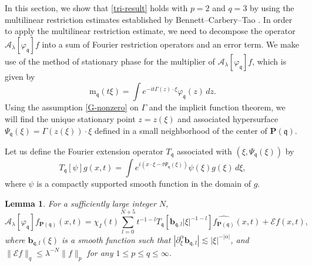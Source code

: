 \documentclass[10pt] %
{amsart}
\theoremstyle{plain}
\newtheorem{lem}[thm]{Lemma}
\numberwithin{equation}{section}
\newcommand{\fq}{\mathfrak q}
\begin{document}
In this section, we show that \eqref{tri-result} holds with $p=2$ and $q=3$ by using the multilinear restriction estimates established by Bennett--Carbery--Tao \cite{BCT}.
In order to apply the multilinear restriction estimate, we need to decompose the operator $\mathcal A_\lambda  [\varphi_{\mathfrak q}]f$ into a sum of Fourier restriction operators and an error term. 
We make use of the method of stationary phase for the multiplier of $\mathcal A_\lambda  [\varphi_{\mathfrak q }]f $, which is given by 
\[
\mathrm m_\fq (t\xi) =  \int e^{-it  \Gamma(z)\cdot \xi} \varphi_{\fq}(z )\,dz. 
\]
Using the assumption \eqref{G-nonzero} on $\Gamma$ and the implicit function theorem, we will find the unique stationary point $z = z(\xi)$ and associated hypersurface $\Psi_\fq(\xi) = \Gamma(z(\xi))\cdot \xi$ defined in a small neighborhood of the center of $\mathbf P(\fq)$. 

Let us define the Fourier extension operator $T_\fq$ associated with $(\xi,\Psi_\fq(\xi))$ by  
\[  
T_\fq [ \psi] g(x,t)=\int  e^{i  ( x\cdot \xi - t\Psi_\fq (\xi)  ) } \psi( \xi)  g(\xi)\,d\xi ,
\]
where $\psi$ is a compactly supported smooth function in the domain of $g$. 


\begin{lem}\label{average-sum} 
For a sufficiently large integer $N$, 
\[ 
\mathcal A_\lambda[\varphi_{\fq}] f_{\mathbf P(\fq)}(x,t)   = \chi_I(t) \sum_{l=0}^{N+5} t^{-1-l}   T_\fq [\mathbf b_{\fq,l}|\xi|^{-1-l}] \widehat {f_{\mathbf P(\fq)}}   (x,t)+ \mathcal E f   (x,t),
\]
 where  $\mathbf b_{\fq,l} (\xi)    $ is a smooth function such that $|\partial_\xi^\alpha \mathbf b_{\fq,l} | \lesssim |\xi|^{-|\alpha|}$, and $\|  \mathcal E  f  \|_q \le \lambda^{-N}\|f\|_p$ for any $1 \le p \le q \le \infty$. 
\end{lem} 
 
\end{document}
